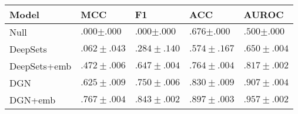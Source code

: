 \begin{tabular}{lllll}
\toprule
Model & \textbf{MCC} & \textbf{F1} & \textbf{ACC} & \textbf{AUROC} \\
\midrule
Null & $.000{\scriptstyle \pm .000}$ & $.000{\scriptstyle \pm .000}$ & $.676{\scriptstyle \pm .000}$ & $.500{\scriptstyle \pm .000}$ \\
DeepSets & $.062\scriptstyle \pm .043$ & $.284\scriptstyle \pm .140$ & $.574\scriptstyle \pm .167$ & $.650\scriptstyle \pm .004$ \\
DeepSets+emb & $.472\scriptstyle \pm .006$ & $.647\scriptstyle \pm .004$ & $.764\scriptstyle \pm .004$ & $.817\scriptstyle \pm .002$ \\
DGN & $.625\scriptstyle \pm .009$ & $.750\scriptstyle \pm .006$ & $.830\scriptstyle \pm .009$ & $.907\scriptstyle \pm .004$ \\
DGN+emb & $\mathbf{.767\scriptstyle \pm .004}$ & $\mathbf{.843\scriptstyle \pm .002}$ & $\mathbf{.897\scriptstyle \pm .003}$ & $\mathbf{.957\scriptstyle \pm .002}$ \\
\bottomrule
\end{tabular}
